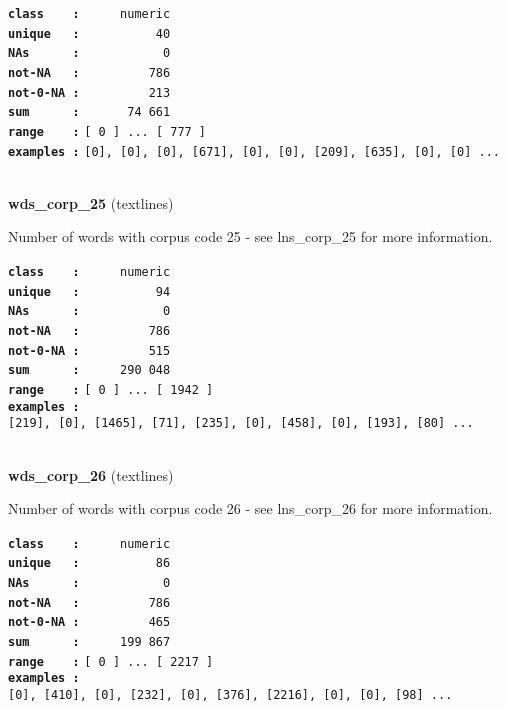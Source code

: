 \documentclass[]{article}
\begin{document}
\textbf{\texttt{class\ \ \ \ :}} \texttt{~~~~~numeric}\\
\textbf{\texttt{unique\ \ \ :}} \texttt{~~~~~~~~~~40}\\
\textbf{\texttt{NAs\ \ \ \ \ \ :}} \texttt{~~~~~~~~~~~0}\\
\textbf{\texttt{not-NA\ \ \ :}} \texttt{~~~~~~~~~786}\\
\textbf{\texttt{not-0-NA\ :}} \texttt{~~~~~~~~~213}\\
\textbf{\texttt{sum\ \ \ \ \ \ :}} \texttt{~~~~~~74~661}\\
\textbf{\texttt{range\ \ \ \ :}}
\texttt{{[}\ 0\ {]}\ ...\ {[}\ 777\ {]}}\\
\textbf{\texttt{examples\ :}}
\texttt{{[}0{]},\ {[}0{]},\ {[}0{]},\ {[}671{]},\ {[}0{]},\ {[}0{]},\ {[}209{]},\ {[}635{]},\ {[}0{]},\ {[}0{]}\ ...}\\

~

\textbf{wds\_corp\_25} (textlines)

Number of words with corpus code 25 - see lns\_corp\_25 for more
information.

\textbf{\texttt{class\ \ \ \ :}} \texttt{~~~~~numeric}\\
\textbf{\texttt{unique\ \ \ :}} \texttt{~~~~~~~~~~94}\\
\textbf{\texttt{NAs\ \ \ \ \ \ :}} \texttt{~~~~~~~~~~~0}\\
\textbf{\texttt{not-NA\ \ \ :}} \texttt{~~~~~~~~~786}\\
\textbf{\texttt{not-0-NA\ :}} \texttt{~~~~~~~~~515}\\
\textbf{\texttt{sum\ \ \ \ \ \ :}} \texttt{~~~~~290~048}\\
\textbf{\texttt{range\ \ \ \ :}}
\texttt{{[}\ 0\ {]}\ ...\ {[}\ 1942\ {]}}\\
\textbf{\texttt{examples\ :}}
\texttt{{[}219{]},\ {[}0{]},\ {[}1465{]},\ {[}71{]},\ {[}235{]},\ {[}0{]},\ {[}458{]},\ {[}0{]},\ {[}193{]},\ {[}80{]}\ ...}\\

~

\textbf{wds\_corp\_26} (textlines)

Number of words with corpus code 26 - see lns\_corp\_26 for more
information.

\textbf{\texttt{class\ \ \ \ :}} \texttt{~~~~~numeric}\\
\textbf{\texttt{unique\ \ \ :}} \texttt{~~~~~~~~~~86}\\
\textbf{\texttt{NAs\ \ \ \ \ \ :}} \texttt{~~~~~~~~~~~0}\\
\textbf{\texttt{not-NA\ \ \ :}} \texttt{~~~~~~~~~786}\\
\textbf{\texttt{not-0-NA\ :}} \texttt{~~~~~~~~~465}\\
\textbf{\texttt{sum\ \ \ \ \ \ :}} \texttt{~~~~~199~867}\\
\textbf{\texttt{range\ \ \ \ :}}
\texttt{{[}\ 0\ {]}\ ...\ {[}\ 2217\ {]}}\\
\textbf{\texttt{examples\ :}}
\texttt{{[}0{]},\ {[}410{]},\ {[}0{]},\ {[}232{]},\ {[}0{]},\ {[}376{]},\ {[}2216{]},\ {[}0{]},\ {[}0{]},\ {[}98{]}\ ...}\\
\end{document}
